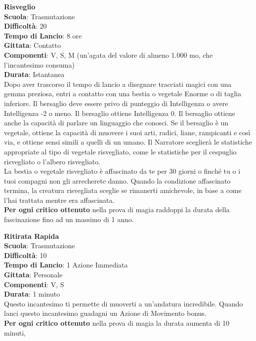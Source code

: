 \begin{multicols}{2}
\medskip\textbf{Risveglio}\\
\textbf{Scuola}: Trasmutazione\\
\textbf{Difficoltà}:  20\\
\textbf{Tempo di Lancio}: 8 ore\\
\textbf{Gittata}: Contatto\\
\textbf{Componenti}: V, S, M (un'agata del valore di almeno 1.000 mo, che l'incantesimo consuma)\\
\textbf{Durata}: Istantanea\\
Dopo aver trascorso il tempo di lancio a disegnare tracciati magici con una gemma preziosa, entri a contatto con una bestia o vegetale Enorme o di taglia inferiore. Il bersaglio deve essere privo di punteggio di Intelligenza o avere Intelligenza -2 o meno. Il bersaglio ottiene Intelligenza 0. Il bersaglio ottiene anche la capacità di parlare un linguaggio che conosci. Se il bersaglio è un vegetale, ottiene la capacità di muovere i suoi arti, radici, liane, rampicanti e così via, e ottiene sensi simili a quelli di un umano. Il Narratore sceglierà le statistiche appropriate al tipo di vegetale risvegliato, come le statistiche per il cespuglio risvegliato o l’albero risvegliato.\\
La bestia o vegetale risvegliato è affascinato da te per 30 giorni o finché tu o i tuoi compagni non gli arrecherete danno. Quando la condizione affascinato termina, la creatura risvegliata sceglie se rimanerti amichevole, in base a come l’hai trattata mentre era affascinata.\\
\textbf{Per ogni critico ottenuto} nella prova di magia raddoppi la durata della fascinazione fino ad un massimo di 1 anno.

\medskip\textbf{Ritirata Rapida}\\
\textbf{Scuola}: Trasmutazione\\
\textbf{Difficoltà}:  10\\
\textbf{Tempo di Lancio}: 1 Azione Immediata\\
\textbf{Gittata}: Personale\\
\textbf{Componenti}: V, S\\
\textbf{Durata}: 1 minuto\\
Questo incantesimo ti permette di muoverti a un'andatura incredibile. Quando lanci questo incantesimo guadagni un Azione di Movimento bonus.\\
\textbf{Per ogni critico ottenuto} nella prova di magia la durata aumenta di 10 minuti,


\end{multicols}
